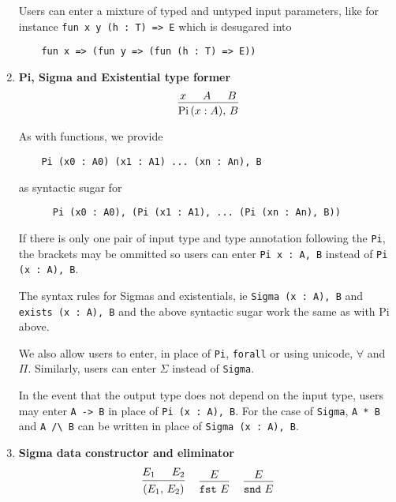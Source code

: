 \documentclass{article}
\begin{document}
\begin{enumerate}
  Users can enter a mixture of typed and untyped input parameters, like for
  instance \verb|fun x y (h : T) => E|
  which is desugared into 
  \begin{verbatim}
    fun x => (fun y => (fun (h : T) => E))
  \end{verbatim}

\item \textbf{Pi, Sigma and Existential type former} \\
  \[
    \begin{prooftree}
      \hypo{x}
      \hypo{A}
      \hypo{B}
      \infer3{\Pii \, (x : A), \, B}
    \end{prooftree}
 \]

  As with functions, we provide
  \begin{verbatim}
    Pi (x0 : A0) (x1 : A1) ... (xn : An), B
  \end{verbatim}

  as syntactic sugar for

  \begin{verbatim}
      Pi (x0 : A0), (Pi (x1 : A1), ... (Pi (xn : An), B))
  \end{verbatim}

  If there is only one pair of input type and type annotation following the \verb|Pi|,
  the brackets may be ommitted so users can enter \verb|Pi x : A, B| instead of
  \verb|Pi (x : A), B|.

  The syntax rules for Sigmas and existentials, ie 
  \verb|Sigma (x : A), B| and \verb|exists (x : A), B| and the above syntactic
  sugar work the same as with Pi above. 

  We also allow users to enter, in place of \verb|Pi|, \verb|forall| or using
  unicode, $\forall$ and $\Pi$.
  Similarly, users can enter $\Sigma$ instead of \verb|Sigma|.

  In the event that the output type does not depend on the input type, users
  may enter \verb|A -> B| in place of \verb|Pi (x : A), B|.
  For the case of \verb|Sigma|, \verb|A * B| and \verb|A /\ B| can be written
  in place of \verb|Sigma (x : A), B|.

  \item \textbf{Sigma data constructor and eliminator} \\
  \begin{gather*}
    \begin{prooftree}
      \hypo{E_1}
      \hypo{E_2}
      \infer2{(E_1, \, E_2)}
    \end{prooftree}  
    ~ \quad
    \begin{prooftree}
      \hypo{E}
      \infer1{\fst \,\, E}
    \end{prooftree}
    ~ \quad
   \begin{prooftree}
    \hypo{E}
    \infer1{\snd \,\, E}
   \end{prooftree}
  \end{gather*}
 

\end{enumerate}
\end{document}
